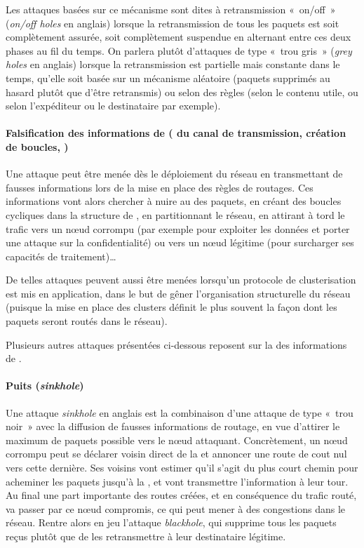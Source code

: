 Les attaques basées sur ce mécanisme sont dites à retransmission « on/off » (\textit{on/off holes} en anglais) lorsque la retransmission de tous les paquets est soit complètement assurée, soit complètement suspendue en alternant entre ces deux phases au fil du temps.
On parlera plutôt d'attaques de type « trou gris » (\textit{grey holes} en anglais) lorsque la retransmission est partielle mais constante dans le temps, qu'elle soit basée sur un mécanisme aléatoire (paquets supprimés au hasard plutôt que d'être retransmis) ou selon des règles (selon le contenu utile, ou selon l'expéditeur ou le destinataire par exemple).

        \paragraph{Falsification des informations de  ( du canal de transmission, création de boucles, \etc)}
Une attaque peut être menée dès le déploiement du réseau en transmettant de fausses informations lors de la mise en place des règles de routages.
Ces informations vont alors chercher à nuire au  des paquets, en créant des boucles cycliques dans la structure de , en partitionnant le réseau, en attirant à tord le trafic vers un nœud corrompu (par exemple pour exploiter les données et porter une attaque sur la confidentialité) ou vers un nœud légitime (pour surcharger ses capacités de traitement)\dots

De telles attaques peuvent aussi être menées lorsqu'un protocole de clusterisation est mis en application, dans le but de gêner l'organisation structurelle du réseau (puisque la mise en place des clusters définit le plus souvent la façon dont les paquets seront routés dans le réseau).

Plusieurs autres attaques présentées ci-dessous reposent sur la  des informations de .

        \paragraph{Puits (\textit{sinkhole})}
Une attaque \textit{sinkhole} en anglais est la combinaison d'une attaque de type « trou noir » avec la diffusion de fausses informations de routage, en vue d'attirer le maximum de paquets possible vers le nœud attaquant.
Concrètement, un nœud corrompu peut se déclarer voisin direct de la \sdb et annoncer une route de cout nul vers cette dernière.
Ses voisins vont estimer qu'il s'agit du plus court chemin pour acheminer les paquets jusqu'à la \sdb, et vont transmettre l'information à leur tour.
Au final une part importante des routes créées, et en conséquence du trafic routé, va passer par ce nœud compromis, ce qui peut mener à des congestions dans le réseau.
Rentre alors en jeu l'attaque \textit{blackhole}, qui supprime tous les paquets reçus plutôt que de les retransmettre à leur destinataire légitime.

